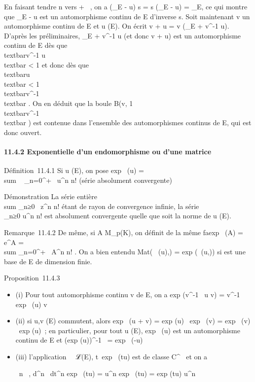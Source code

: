 \documentclass[]{article}
\begin{document}
En faisant tendre n vers + \infty~, on a
(\mathrmId\_E - u) \cdot s = s \cdot
(\mathrmId\_E - u) =
\mathrmId\_E, ce qui montre que
\mathrmId\_E - u est un automorphisme continu
de E d'inverse s. Soit maintenant v un automorphisme continu de E et u
(E). On écrit v + u = v \cdot (\mathrmId\_E +
v^-1 \cdot u). D'après les préliminaires,
\mathrmId\_E + v^-1 \cdot u (et donc v
+ u) est un automorphisme continu de E dès que
\\textbar{}v^-1 \cdot u\\textbar{}
\textless{} 1 et donc dès que
\\textbar{}u\\textbar{} \textless{} 1
\over
\\textbar{}v^-1\\textbar{} .
On en déduit que la boule B(v, 1 \over
\\textbar{}v^-1\\textbar{} )
est contenue dans l'ensemble des automorphismes continus de E, qui est
donc ouvert.

\paragraph{11.4.2 Exponentielle d'un endomorphisme ou d'une matrice}

Définition~11.4.1 Si u (E), on pose exp~ (u)
= \\sum ~
\_n=0^+\infty~ u^n \over n! (série
absolument convergente)

Démonstration La série entière
\\sum  \_n≥0~
z^n \over n! étant de rayon de convergence
infinie, la série \\\sum
 \_n≥0 u^n \over n! est
absolument convergente quelle que soit la norme de u (E).

Remarque~11.4.2 De même, si A \in M\_p(K), on définit de la même
fa\ccon exp~ (A) =
e^A =\ \\sum
 \_n=0^+\infty~ A^n \over n! .
On a bien entendu
Mat(\exp~ (u),)
= exp (\Mat~(u,)) si
 est une base de E de dimension finie.

Proposition~11.4.3

\begin{itemize}
\item
  (i) Pour tout automorphisme continu v de E, on a
  exp (v^-1~ \cdot u \cdot v) =
  v^-1 \cdot exp~ (u) \cdot v
\item
  (ii) si u,v (E) commutent, alors exp~ (u +
  v) = exp (u) \cdot\ exp~
  (v) = exp~ (v) \cdot\
  exp (u)~; en particulier, pour tout u (E),
  exp~ (u) est un automorphisme continu de E et
  (exp (u))^-1~
  = exp~ (-u)
\item
  (iii) l'application ~\mapsto~ℒ(E),
  t\mapsto~exp~ (tu) est de
  classe C^\infty~ et on a

  \forall~n \in {}~, d^n~
  \over dt^n  exp~
  (tu) = u^n \cdot exp~ (tu)
  = exp (tu) \cdot u^n~
\end{itemize}
\end{document}
